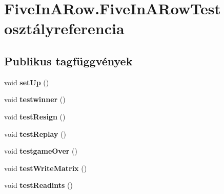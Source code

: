 \hypertarget{class_five_in_a_row_1_1_five_in_a_row_test}{}\section{Five\+In\+A\+Row.\+Five\+In\+A\+Row\+Test osztályreferencia}
\label{class_five_in_a_row_1_1_five_in_a_row_test}
\subsection*{Publikus tagfüggvények}
\begin{DoxyCompactItemize}
\item 
\mbox{\label{class_five_in_a_row_1_1_five_in_a_row_test_adf128eba6d432222a14f9d301ab55ab1}} 
void {\bfseries set\+Up} ()
\item 
\mbox{\label{class_five_in_a_row_1_1_five_in_a_row_test_a49bf96385805bd46340df2213c63f4d3}} 
void {\bfseries testwinner} ()
\item 
\mbox{\label{class_five_in_a_row_1_1_five_in_a_row_test_acfd2d0ea7e0f3345eafaf55c3d565b4d}} 
void {\bfseries test\+Resign} ()
\item 
\mbox{\label{class_five_in_a_row_1_1_five_in_a_row_test_ae760b4f8aed4884c9f7c60d3028538b3}} 
void {\bfseries test\+Replay} ()
\item 
\mbox{\label{class_five_in_a_row_1_1_five_in_a_row_test_ac23c2d8930f90449c62b3b9b43acbfa6}} 
void {\bfseries testgame\+Over} ()
\item 
\mbox{\label{class_five_in_a_row_1_1_five_in_a_row_test_a9f397759579ff8dd314f952d7f825fe0}} 
void {\bfseries test\+Write\+Matrix} ()
\item 
\mbox{\label{class_five_in_a_row_1_1_five_in_a_row_test_a677f37ef888bbc0901a9c0ca24a44fef}} 
void {\bfseries test\+Readints} ()
\item 
\mbox{\label{class_five_in_a_row_1_1_five_in_a_row_test_a818982fff4cab9cfea674c3ddd5dd38c}} 

\end{DoxyCompactItemize}
